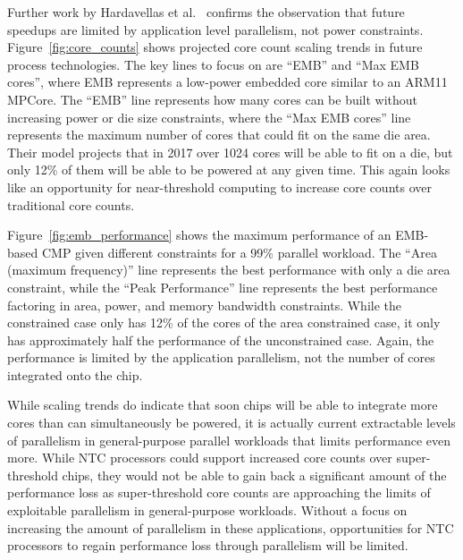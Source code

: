 Further work by Hardavellas et al.~\cite{Hardavellas:2011de} confirms the
observation that future speedups are limited by application level parallelism,
not power constraints. Figure~\ref{fig:core_counts} shows projected core count
scaling trends in future process technologies. The key lines to focus on are
``EMB'' and ``Max EMB cores'', where EMB represents a low-power embedded core
similar to an ARM11 MPCore. The ``EMB'' line represents how many cores can be
built without increasing power or die size constraints, where the ``Max EMB
cores'' line represents the maximum number of cores that could fit on the same
die area.  Their model projects that in 2017 over 1024 cores will be able to fit
on a die, but only 12\% of them will be able to be powered at any given time.
This again looks like an opportunity for near-threshold computing to increase
core counts over traditional core counts.

Figure~\ref{fig:emb_performance} shows the maximum performance of an EMB-based
CMP given different constraints for a 99\% parallel workload. The ``Area
(maximum frequency)'' line represents the best performance with only a die area
constraint, while the ``Peak Performance'' line represents the best performance
factoring in area, power, and memory bandwidth constraints. While the
constrained case only has 12\% of the cores of the area constrained case, it
only has approximately half the performance of the unconstrained case. Again,
the performance is limited by the application parallelism, not the number of
cores integrated onto the chip.

While scaling trends do indicate that soon chips will be able to integrate more
cores than can simultaneously be powered, it is actually current extractable
levels of parallelism in general-purpose parallel workloads that limits
performance even more. While NTC processors could support increased core counts
over super-threshold chips, they would not be able to gain back a significant
amount of the performance loss as super-threshold core counts are approaching
the limits of exploitable parallelism in general-purpose workloads. Without a
focus on increasing the amount of parallelism in these applications,
opportunities for NTC processors to regain performance loss through parallelism
will be limited.

